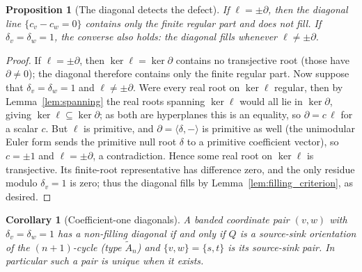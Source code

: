 \documentclass[11pt, a4paper]{amsart}
\newtheorem{proposition}[theorem]{Proposition}
\newtheorem{corollary}[theorem]{Corollary}
\theoremstyle{definition}
\begin{document}
\begin{proposition}[The diagonal detects the defect]
\label{prop:diagonal_defect}
If $\ell = \pm\partial$, then the diagonal line
$\{c_v-c_w=0\}$ contains only the finite regular part and does not fill. If
$\delta_v=\delta_w=1$, the converse also holds: the diagonal fills whenever
$\ell \neq \pm\partial$.
\end{proposition}

\begin{proof}
If $\ell = \pm\partial$, then
$\ker\ell = \ker\partial$ contains no transjective root \textup{(}those
have $\partial \neq 0$\textup{)}; the diagonal therefore contains only the
finite regular part. Now suppose that $\delta_v=\delta_w=1$ and
$\ell \neq \pm\partial$. Were every real root on $\ker\ell$ regular,
then by Lemma~\ref{lem:spanning} the real roots spanning $\ker\ell$ would all
lie in $\ker\partial$, giving $\ker\ell \subseteq \ker\partial$; as both are
hyperplanes this is an equality, so $\partial = c\,\ell$ for a scalar $c$. But
$\ell$ is primitive, and $\partial = \langle\delta, -\rangle$ is primitive as
well \textup{(}the unimodular Euler form sends the primitive null root
$\delta$ to a primitive coefficient vector\textup{)}, so $c = \pm 1$ and
$\ell = \pm\partial$, a contradiction. Hence some real root on $\ker\ell$ is
transjective. Its finite-root representative has difference zero, and the
only residue modulo $\delta_v=1$ is zero; thus the diagonal fills by
Lemma~\ref{lem:filling_criterion}, as desired.
\end{proof}

\begin{corollary}[Coefficient-one diagonals]
\label{cor:diagonal_classification}
A banded coordinate pair $(v, w)$ with
$\delta_v=\delta_w=1$ has a non-filling diagonal if and only if $Q$ is a
source-sink orientation of the $(n+1)$-cycle
\textup{(}type $\widetilde{A}_n$\textup{)} and
$\{v, w\} = \{s, t\}$ is its source-sink pair. In particular such a pair is
unique when it exists.
\end{corollary}
\end{document}
